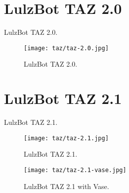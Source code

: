 %
%
%
%
%

\section{LulzBot TAZ 2.0}
LulzBot TAZ 2.0.

\begin{figure}[h!]
\texttt{[image: taz/taz-2.0.jpg]}
 \caption{LulzBot TAZ 2.0.}
 \label{fig:taz-2.0}
\end{figure}

\section{LulzBot TAZ 2.1}
LulzBot TAZ 2.1.

\begin{figure}[h!]
\texttt{[image: taz/taz-2.1.jpg]}
 \caption{LulzBot TAZ 2.1.}
 \label{fig:taz-2.1}
\end{figure}

\begin{figure}[h!]
\texttt{[image: taz/taz-2.1-vase.jpg]}
 \caption{LulzBot TAZ 2.1 with Vase.}
 \label{fig:taz-2.1-vase}
\end{figure}

